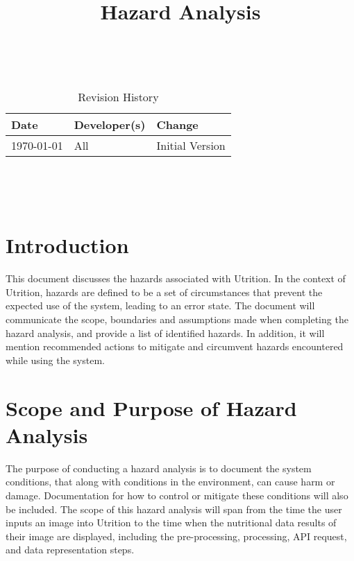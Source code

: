 \documentclass{article}
\title{Hazard Analysis\\\progname}
\author{\authname}
\date{}
\begin{document}
\maketitle
\thispagestyle{empty}

~\newpage


\begin{table}[hp]
	\caption{Revision History} \label{TblRevisionHistory}
	\begin{tabularx}{\textwidth}{llX}
		\toprule
		\textbf{Date} & \textbf{Developer(s)} & \textbf{Change}\\
		\midrule
		\today & All & Initial Version\\
		\bottomrule
	\end{tabularx}
\end{table}

~\newpage

\tableofcontents
\listoftables

~\newpage



\section{Introduction}

This document discusses the hazards associated with Utrition. In the context 
of Utrition, hazards are defined to be a set of circumstances that prevent 
the expected use of the system, leading to an error state. The document will 
communicate the scope, boundaries and assumptions made when completing the 
hazard analysis, and provide a list of identified hazards. In addition, it will 
mention recommended actions to mitigate and circumvent hazards encountered 
while using the system.

\section{Scope and Purpose of Hazard Analysis}
The purpose of conducting a hazard analysis is to document the system conditions, that along with conditions in the environment, can cause harm or damage. Documentation for how to control or mitigate these conditions will also be included. The scope of this hazard analysis will span from the time the user inputs an image into Utrition to the time when the nutritional data results of their image are displayed, including the pre-processing, processing, API request, and data representation steps.
\end{document}
